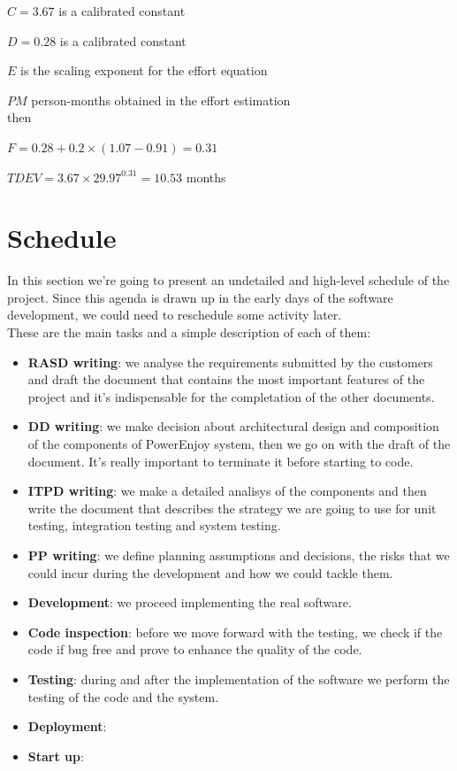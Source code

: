 \documentclass[english]{article}
\begin{document}
$C = 3.67$ is a calibrated constant

$D = 0.28$ is a calibrated constant

$E$ is the scaling exponent for the effort equation

$PM$ person-months obtained in the effort estimation\\
then

$F = 0.28 + 0.2 \times (1.07 - 0.91) = 0.31$

$TDEV = 3.67 \times 29.97^{0.31} = 10.53$ months

\section{Schedule}

In this section we're going to present an undetailed and high-level schedule of the project. Since this agenda is drawn up in the early days of the software development, we could need to reschedule some activity later.\\
These are the main tasks and a simple description of each of them:

\begin{itemize}
	\item{\textbf{RASD writing}: we analyse the requirements submitted by the customers and draft the document that contains the most important features of the project and it's indispensable for the completation of the other documents.}
	
	\item{\textbf{DD writing}: we make decision about architectural design and composition of the components of PowerEnjoy system, then we go on with the draft of the document. It's really important to terminate it before starting to code.}

	\item{\textbf{ITPD writing}: we make a detailed analisys of the components and then write the document that describes the strategy we are going to use for unit testing, integration testing and system testing.}

	\item{\textbf{PP writing}: we define planning assumptions and decisions, the risks that we could incur during the development and how we could tackle them.}

	\item{\textbf{Development}: we proceed implementing the real software.}

	\item{\textbf{Code inspection}: before we move forward with the testing, we check if the code if bug free and prove to enhance the quality of the code.}

	\item{\textbf{Testing}: during and after the implementation of the software we perform the testing of the code and the system.}

	\item{\textbf{Deployment}: }

	\item{\textbf{Start up}: }
\end{itemize}
\end{document}
